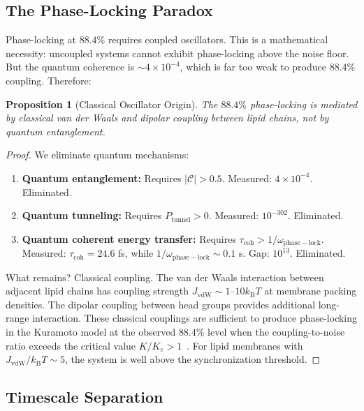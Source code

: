 \documentclass[twocolumn,10pt,a4paper]{article}
\newtheorem{proposition}[theorem]{Proposition}
\theoremstyle{definition}
\theoremstyle{remark}
\newcommand{\kB}{k_{\mathrm{B}}}
\begin{document}
\subsection{The Phase-Locking Paradox}

Phase-locking at $88.4\%$ requires coupled oscillators. This is a mathematical necessity: uncoupled systems cannot exhibit phase-locking above the noise floor. But the quantum coherence is $\sim 4 \times 10^{-4}$, which is far too weak to produce $88.4\%$ coupling. Therefore:

\begin{proposition}[Classical Oscillator Origin]
\label{prop:classical_origin}
The $88.4\%$ phase-locking is mediated by classical van der Waals and dipolar coupling between lipid chains, not by quantum entanglement.
\end{proposition}

\begin{proof}
We eliminate quantum mechanisms:
\begin{enumerate}[label=(\roman*)]
    \item \textbf{Quantum entanglement:} Requires $|\mathcal{C}| > 0.5$. Measured: $4 \times 10^{-4}$. Eliminated.
    \item \textbf{Quantum tunneling:} Requires $P_{\mathrm{tunnel}} > 0$. Measured: $10^{-302}$. Eliminated.
    \item \textbf{Quantum coherent energy transfer:} Requires $\tau_{\mathrm{coh}} > 1/\omega_{\mathrm{phase-lock}}$. Measured: $\tau_{\mathrm{coh}} = 24.6$ fs, while $1/\omega_{\mathrm{phase-lock}} \sim 0.1$ s. Gap: $10^{13}$. Eliminated.
\end{enumerate}
What remains? Classical coupling. The van der Waals interaction between adjacent lipid chains has coupling strength $J_{\mathrm{vdW}} \sim 1$--$10 \kB T$ at membrane packing densities. The dipolar coupling between head groups provides additional long-range interaction. These classical couplings are sufficient to produce phase-locking in the Kuramoto model at the observed $88.4\%$ level when the coupling-to-noise ratio exceeds the critical value $K/K_c > 1$~\citep{kuramoto1984chemical}. For lipid membranes with $J_{\mathrm{vdW}} / \kB T \sim 5$, the system is well above the synchronization threshold. \qedhere
\end{proof}

\subsection{Timescale Separation}
\end{document}
